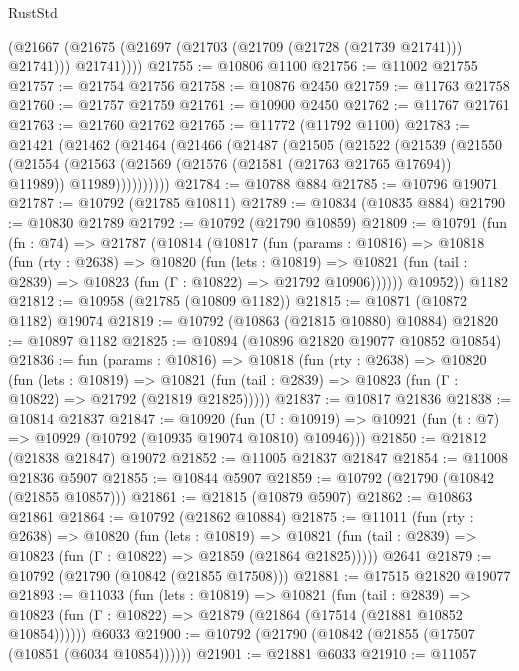 \begin{lexlean}{RustStd}
\begin{coremodule}
          (@21667 (@21675 (@21697 (@21703 (@21709 (@21728 (@21739 @21741))) @21741))) @21741))))
@21755 := @10806 @1100
@21756 := @11002 @21755
@21757 := @21754 @21756
@21758 := @10876 @2450
@21759 := @11763 @21758
@21760 := @21757 @21759
@21761 := @10900 @2450
@21762 := @11767 @21761
@21763 := @21760 @21762
@21765 := @11772 (@11792 @1100)
@21783 := @21421
    (@21462
      (@21464
        (@21466
          (@21487
            (@21505
              (@21522
                (@21539
                  (@21550
                    (@21554
                      (@21563
                        (@21569 (@21576 (@21581 (@21763 @21765 @17694)) @11989))
                        @11989))))))))))
@21784 := @10788 @884
@21785 := @10796 @19071
@21787 := @10792 (@21785 @10811)
@21789 := @10834 (@10835 @884)
@21790 := @10830 @21789
@21792 := @10792 (@21790 @10859)
@21809 := @10791
    (fun (fn : @74) =>
    @21787
      (@10814
        (@10817
          (fun (params : @10816) =>
          @10818
            (fun (rty : @2638) =>
            @10820
              (fun (lets : @10819) =>
              @10821 (fun (tail : @2839) => @10823 (fun (Γ : @10822) => @21792 @10906))))))
        @10952))
    @1182
@21812 := @10958 (@21785 (@10809 @1182))
@21815 := @10871 (@10872 @1182) @19074
@21819 := @10792 (@10863 (@21815 @10880) @10884)
@21820 := @10897 @1182
@21825 := @10894 (@10896 @21820 @19077 @10852 @10854)
@21836 := fun (params : @10816) =>
  @10818
    (fun (rty : @2638) =>
    @10820
      (fun (lets : @10819) =>
      @10821 (fun (tail : @2839) => @10823 (fun (Γ : @10822) => @21792 (@21819 @21825)))))
@21837 := @10817 @21836
@21838 := @10814 @21837
@21847 := @10920
    (fun (U : @10919) => @10921 (fun (t : @7) => @10929 (@10792 (@10935 @19074 @10810) @10946)))
@21850 := @21812 (@21838 @21847) @19072
@21852 := @11005 @21837 @21847
@21854 := @11008 @21836 @5907
@21855 := @10844 @5907
@21859 := @10792 (@21790 (@10842 (@21855 @10857)))
@21861 := @21815 (@10879 @5907)
@21862 := @10863 @21861
@21864 := @10792 (@21862 @10884)
@21875 := @11011
    (fun (rty : @2638) =>
    @10820
      (fun (lets : @10819) =>
      @10821 (fun (tail : @2839) => @10823 (fun (Γ : @10822) => @21859 (@21864 @21825)))))
    @2641
@21879 := @10792 (@21790 (@10842 (@21855 @17508)))
@21881 := @17515 @21820 @19077
@21893 := @11033
    (fun (lets : @10819) =>
    @10821
      (fun (tail : @2839) =>
      @10823 (fun (Γ : @10822) => @21879 (@21864 (@17514 (@21881 @10852 @10854))))))
    @6033
@21900 := @10792 (@21790 (@10842 (@21855 (@17507 (@10851 (@6034 @10854))))))
@21901 := @21881 @6033
@21910 := @11057

\end{coremodule}
\end{lexlean}
